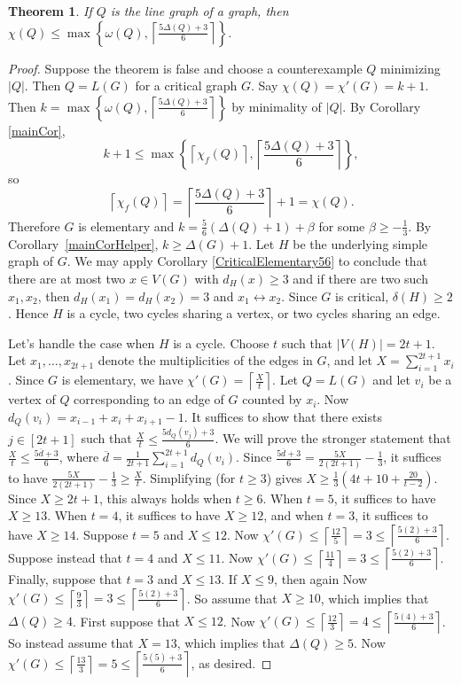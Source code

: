 \documentclass[12pt]{amsart}
\theoremstyle{plain}
\newtheorem{thm}{Theorem}
\theoremstyle{definition}
\theoremstyle{remark}
\newcommand{\set}[1]{\left\{ #1 \right\}}
\newcommand{\card}[1]{\left|#1\right|}
\newcommand{\ceil}[1]{\left\lceil#1\right\rceil}
\newcommand{\parens}[1]{\left( #1 \right)}
\def\adj{\leftrightarrow}
\begin{document}
\begin{thm}
If $Q$ is the line graph of a
graph, then $\chi(Q)\le \max\set{\omega(Q),\ceil{\frac{5\Delta(Q)+3}{6}}}$.
\end{thm}
\begin{proof}
Suppose the theorem is false and choose a counterexample $Q$ minimizing $\card{Q}$.  Then $Q = L(G)$ for a critical graph $G$.  Say $\chi(Q) = \chi'(G) = k + 1$.  Then
$k = \max\set{\omega(Q),\ceil{\frac{5\Delta(Q)+3}{6}}}$ by minimality of $\card{Q}$.  By Corollary \ref{mainCor},
\[k+1 \le \max\set{\ceil{\chi_f(Q)}, \ceil{\frac{5\Delta(Q)+3}{6}}},\]
so
\[\ceil{\chi_f(Q)} = \ceil{\frac{5\Delta(Q)+3}{6}} + 1 = \chi(Q).\]
Therefore $G$ is elementary and $k = \frac56\parens{\Delta(Q) + 1} + \beta$ for some $\beta \ge -\frac13$.  By Corollary~\ref{mainCorHelper}, $k \ge \Delta(G) + 1$.
Let $H$ be the underlying simple graph of $G$.
We may apply Corollary \ref{CriticalElementary56} to conclude that there are at most two $x \in V(G)$ with $d_H(x) \ge 3$
and if there are two such $x_1, x_2$, then $d_H(x_1) = d_H(x_2) = 3$ and $x_1 \adj x_2$.  
Since $G$ is critical, $\delta(H) \ge 2$.  Hence $H$ is a cycle, two cycles sharing a vertex, or two cycles sharing an edge.

Let's handle the case when $H$ is a cycle.  Choose $t$ such that $|V(H)|=2t+1$.
Let $x_1,\ldots,x_{2t+1}$ denote the multiplicities of the edges in $G$, and let
$X=\sum_{i=1}^{2t+1}x_i$.  Since $G$ is elementary, we have
$\chi'(G)=\ceil{\frac{X}t}$.  
Let $Q=L(G)$ and let $v_i$ be a vertex of $Q$
corresponding to an edge of $G$ counted by $x_i$.  Now
$d_Q(v_i)=x_{i-1}+x_i+x_{i+1}-1$.  It suffices to show that there exists
$j\in[2t+1]$ such that $\frac{X}t\le \frac{5d_Q(v_j)+3}6$.  We will prove the
stronger statement that $\frac{X}t\le \frac{5\overline{d}+3}6$, where
$\overline{d}=\frac{1}{2t+1}\sum_{i=1}^{2t+1}d_Q(v_i)$.
Since $\frac{5\overline{d}+3}6 =\frac{5X}{2(2t+1)}-\frac13$, it suffices to have 
$\frac{5X}{2(2t+1)}-\frac13\ge \frac{X}t$.  Simplifying (for $t\ge 3$) gives $X\ge
\frac13(4t+10+\frac{20}{t-2})$.  Since $X\ge 2t+1$, this always holds when $t\ge
6$.  When $t=5$, it suffices to have $X\ge 13$.  When $t=4$, it suffices to have
$X\ge 12$, and when $t=3$, it suffices to have $X\ge 14$.  Suppose $t=5$ and
$X\le 12$.  
Now $\chi'(G)\le \ceil{\frac{12}5}=3\le\ceil{\frac{5(2)+3}6}$.
Suppose instead that $t=4$ and $X\le 11$.
Now $\chi'(G)\le \ceil{\frac{11}4}=3\le\ceil{\frac{5(2)+3}6}$.
Finally, suppose that $t=3$ and $X\le 13$.
If $X\le 9$, then again 
Now $\chi'(G)\le \ceil{\frac{9}3}=3\le\ceil{\frac{5(2)+3}6}$.
So assume that $X\ge 10$, which implies that $\Delta(Q)\ge 4$.
First suppose that $X\le 12$.
Now $\chi'(G)\le \ceil{\frac{12}3}=4\le\ceil{\frac{5(4)+3}6}$.
So instead assume that $X=13$, which implies that $\Delta(Q)\ge 5$.
Now $\chi'(G)\le \ceil{\frac{13}3}=5\le\ceil{\frac{5(5)+3}6}$, as desired.


\end{proof}
\end{document}
